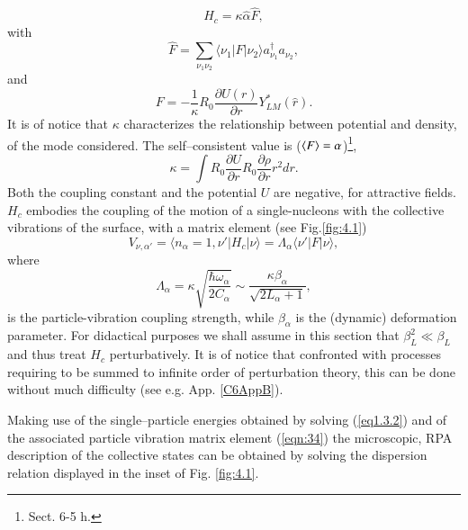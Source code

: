 \begin{equation}\label{eqintroD2}
H_{c} = \kappa \hat{\alpha} \hat{F} ,
\end{equation}
with
\begin{equation}
\hat{F} = \sum_{\nu_1 \nu_2} \langle \nu_1|F|\nu_2 \rangle a_{\nu_1}^{\dagger} a_{\nu_2} ,
\label{eqn:32}
\end{equation}
and
\begin{equation}
F = - \frac{1}{\kappa} R_0 \frac{\partial U(r)}{\partial r} Y_{LM}^* (\hat{r}) .
\label{eqn:33}
\end{equation}
It is of notice that $\kappa$ characterizes the relationship between potential and density, of the mode considered. The self--consistent value is ($\langle {F} \rangle=\alpha$)\footnote{\cite{Bohr:75} Sect. 6-5 h.}, 
\begin{equation}
\kappa=\int R_0\frac{\partial U}{\partial r}R_0\frac{\partial \rho}{\partial r}r^2dr.
\end{equation}
Both the coupling constant and the potential $U$ are negative, for attractive fields.
 $H_{c}$ embodies the coupling of the motion of a single-nucleons with the collective vibrations of the surface, with a matrix element (see Fig.\ref{fig:4.1})
\begin{equation}
V_{\nu,\alpha'}=\langle n_{\alpha} = 1, \nu' |H_{c}|\nu \rangle  = \Lambda_{\alpha} \langle \nu' |F|\nu \rangle ,
\label{eqn:34}
\end{equation}
where
\begin{equation}\label{eqintroD6}
\Lambda_{\alpha} = \kappa \sqrt{\frac{\hbar\omega_{\alpha}}{2C_{\alpha}}} \sim \frac{\kappa \beta_{\alpha}}{\sqrt{2L_{\alpha}+1}} ,
\end{equation}
is the particle-vibration coupling strength, while $\beta_\alpha$ is the (dynamic) deformation parameter. For didactical purposes we shall assume in this section that $\beta_L^2 \ll \beta_L$ and thus  treat  $H_{c}$ perturbatively. It is of notice that confronted with processes requiring to be summed to infinite order of perturbation theory, this can be done without much difficulty (see e.g. App. \ref{C6AppB}).

Making use of the single--particle energies obtained by solving (\ref{eq1.3.2}) and of the associated particle vibration matrix element (\ref{eqn:34}) the microscopic, RPA description of the collective states can be obtained by solving the dispersion relation displayed in the inset of Fig. \ref{fig:4.1}.

